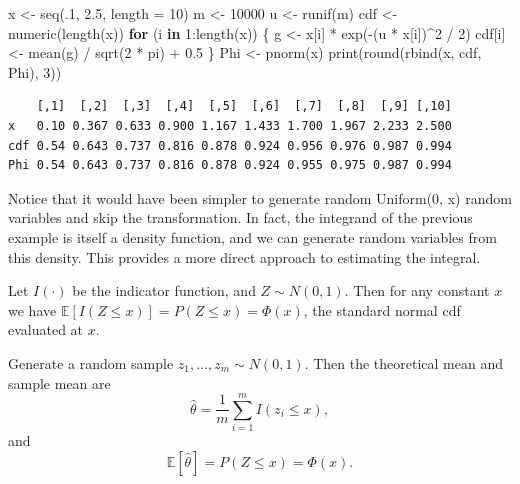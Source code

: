 \documentclass[
  letterpaper,
  DIV=11,
  numbers=noendperiod]{scrreprt}
\newenvironment{Shaded}{\begin{snugshade}}{\end{snugshade}}
\newcommand{\AttributeTok}[1]{\textcolor[rgb]{0.40,0.45,0.13}{#1}}
\newcommand{\ControlFlowTok}[1]{\textcolor[rgb]{0.00,0.23,0.31}{\textbf{#1}}}
\newcommand{\DecValTok}[1]{\textcolor[rgb]{0.68,0.00,0.00}{#1}}
\newcommand{\FloatTok}[1]{\textcolor[rgb]{0.68,0.00,0.00}{#1}}
\newcommand{\FunctionTok}[1]{\textcolor[rgb]{0.28,0.35,0.67}{#1}}
\newcommand{\NormalTok}[1]{\textcolor[rgb]{0.00,0.23,0.31}{#1}}
\newcommand{\OtherTok}[1]{\textcolor[rgb]{0.00,0.23,0.31}{#1}}
\newcommand{\SpecialCharTok}[1]{\textcolor[rgb]{0.37,0.37,0.37}{#1}}
\begin{document}
\begin{Shaded}
\begin{Highlighting}[]
\NormalTok{x }\OtherTok{\textless{}{-}} \FunctionTok{seq}\NormalTok{(.}\DecValTok{1}\NormalTok{, }\FloatTok{2.5}\NormalTok{, }\AttributeTok{length =} \DecValTok{10}\NormalTok{)}
\NormalTok{m }\OtherTok{\textless{}{-}} \DecValTok{10000}
\NormalTok{u }\OtherTok{\textless{}{-}} \FunctionTok{runif}\NormalTok{(m)}
\NormalTok{cdf }\OtherTok{\textless{}{-}} \FunctionTok{numeric}\NormalTok{(}\FunctionTok{length}\NormalTok{(x))}
\ControlFlowTok{for}\NormalTok{ (i }\ControlFlowTok{in} \DecValTok{1}\SpecialCharTok{:}\FunctionTok{length}\NormalTok{(x)) \{}
\NormalTok{  g }\OtherTok{\textless{}{-}}\NormalTok{ x[i] }\SpecialCharTok{*} \FunctionTok{exp}\NormalTok{(}\SpecialCharTok{{-}}\NormalTok{(u }\SpecialCharTok{*}\NormalTok{ x[i])}\SpecialCharTok{\^{}}\DecValTok{2} \SpecialCharTok{/} \DecValTok{2}\NormalTok{)}
\NormalTok{  cdf[i] }\OtherTok{\textless{}{-}} \FunctionTok{mean}\NormalTok{(g) }\SpecialCharTok{/} \FunctionTok{sqrt}\NormalTok{(}\DecValTok{2} \SpecialCharTok{*}\NormalTok{ pi) }\SpecialCharTok{+} \FloatTok{0.5}
\NormalTok{\}}
\NormalTok{Phi }\OtherTok{\textless{}{-}} \FunctionTok{pnorm}\NormalTok{(x)}
\FunctionTok{print}\NormalTok{(}\FunctionTok{round}\NormalTok{(}\FunctionTok{rbind}\NormalTok{(x, cdf, Phi), }\DecValTok{3}\NormalTok{))}
\end{Highlighting}
\end{Shaded}

\begin{verbatim}
    [,1]  [,2]  [,3]  [,4]  [,5]  [,6]  [,7]  [,8]  [,9] [,10]
x   0.10 0.367 0.633 0.900 1.167 1.433 1.700 1.967 2.233 2.500
cdf 0.54 0.643 0.737 0.816 0.878 0.924 0.956 0.976 0.987 0.994
Phi 0.54 0.643 0.737 0.816 0.878 0.924 0.955 0.975 0.987 0.994
\end{verbatim}

Notice that it would have been simpler to generate random Uniform(0, x)
random variables and skip the transformation. In fact, the integrand of
the previous example is itself a density function, and we can generate
random variables from this density. This provides a more direct approach
to estimating the integral.

Let \(I(\cdot)\) be the indicator function, and \(Z\sim N(0,1)\). Then
for any constant \(x\) we have
\(\mathbb{E}[I(Z ≤ x)] = P (Z ≤ x) =\Phi(x)\), the standard normal cdf
evaluated at \(x\).

Generate a random sample \(z_1, \dots , z_m\sim N(0,1)\). Then the
theoretical mean and sample mean are
\[\hat{\theta}= \frac{1}{m} \sum_{i=1}^m I(z_i \le x),\] and
\[\mathbb{E}[\hat{\theta}] = P(Z \le x) = \Phi(x).\]
\end{document}
